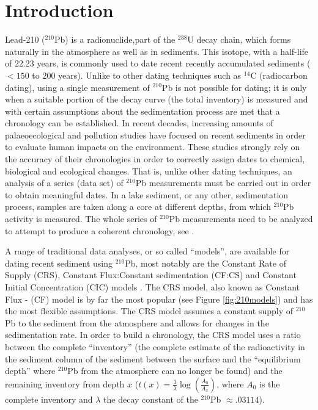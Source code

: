 \documentclass [10pt] {article}
\begin{document}
\section{Introduction}

Lead-210 ($^{210}$Pb) is a radionuclide,part of the $^{238}$U decay chain, which forms naturally in the atmosphere as well as in sediments.
This isotope, with a half-life of 22.23 years, is commonly used to date recent recently accumulated sediments ($<150$ to $200$ years). 
Unlike to other dating techniques such as $^{14}$C (radiocarbon dating), using a single measurement of $^{210}$Pb is not possible for dating; it is only when a suitable portion of the decay curve (the total inventory) is measured and with certain assumptions about the sedimentation process are met that a chronology can be established.  
In recent decades, increasing amounts of palaeoecological and pollution studies have focused on recent sediments \citep[e.g.,][]{Courtney2019} in order to evaluate human impacts on the environment.
These studies strongly rely on the accuracy of their chronologies in order to correctly assign dates to chemical, biological and ecological changes.
That is, unlike other dating techniques, an analysis of a series (data set) of $^{210}$Pb measurements must be carried out in order to obtain meaningful dates.  In a lake sediment, or any other, sedimentation process, samples are taken along a core at different depths, from which $^{210}$Pb activity is measured.  
The whole series of $^{210}$Pb measurements need to be analyzed to attempt to produce a coherent chronology, see \cite{Aquino2018}.

A range of traditional data analyses, or so called ``models'', are available for dating recent sediment using $^{210}$Pb, most notably are the Constant Rate of Supply (CRS), Constant Flux:Constant sedimentation (CF:CS) and Constant Initial Concentration (CIC) models \citep{Appleby1978,Robbins1978,Sanchez-Cabeza2012} . 
The CRS model, also known as Constant Flux - (CF) model is by far the most popular (see Figure \ref{fig:210models}) and has the most flexible assumptions. 
The CRS model assumes a constant supply of $^{210}$Pb to the sediment from the atmosphere and allows for changes in the sedimentation rate. 
In order to build a chronology, the CRS model uses a ratio between the complete ``inventory'' (the complete estimate of the radioactivity in the sediment column of the sediment between the surface and the ``equilibrium depth'' where $^{210}$Pb from the atmosphere can no longer be found) and the remaining  inventory from depth $x$ ($t(x)=\frac{1}{\lambda}\log\left( \frac{A_0}{A_x}\right)$, where $A_0$ is the complete inventory and $\lambda$ the decay constant of the $^{210}$Pb $\approx .03114$).
\end{document}
